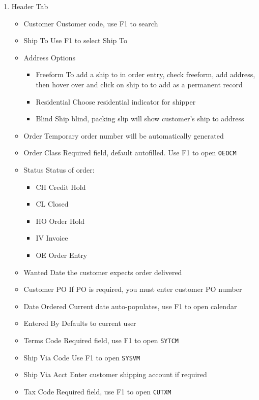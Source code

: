 \begin{enumerate}
	\item Header Tab
	\begin{itemize}
		\item Customer \textemdash Customer code, use F1 to search
		\item Ship To \textemdash Use F1 to select Ship To
		\item Address Options
		\begin{itemize}
			\item Freeform \textemdash To add a ship to in order entry, check freeform, add address, then hover over and click on ship to to add as a permanent record
			\item Residential \textemdash Choose residential indicator for shipper
			\item Blind \textemdash Ship blind, packing slip will show customer's ship to address
		\end{itemize}
		\item Order \textemdash Temporary order number will be automatically generated
		\item Order Class \textemdash Required field, default autofilled. Use F1 to open \texttt{OEOCM}
		\item Status \textemdash Status of order:
		\begin{itemize}
			\item CH \textemdash Credit Hold
			\item CL \textemdash Closed
			\item HO \textemdash Order Hold
			\item IV \textemdash Invoice
			\item OE \textemdash Order Entry
		\end{itemize}
		\item Wanted \textemdash Date the customer expects order delivered
		\item Customer PO \textemdash If PO is required, you must enter customer PO number
		\item Date Ordered \textemdash Current date auto-populates, use F1 to open calendar
		\item Entered By \textemdash Defaults to current user
		\item Terms Code \textemdash Required field, use F1 to open \texttt{SYTCM}
		\item Ship Via Code \textemdash Use F1 to open \texttt{SYSVM}
		\item Ship Via Acct \textemdash Enter customer shipping account if required
		\item Tax Code \textemdash Required field, use F1 to open \texttt{CUTXM}

\end{itemize}
\end{enumerate}
